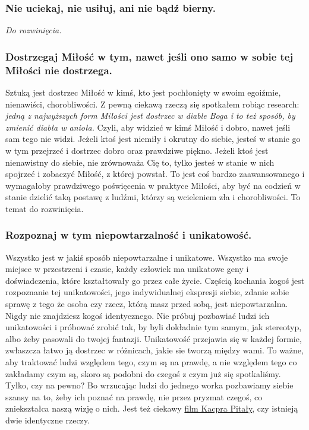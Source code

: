 \documentclass[../dotknieci-miloscia.tex]{subfiles}
\begin{document}
\subsubsection{Nie uciekaj, nie usiłuj, ani nie bądź bierny.}
\emph{Do rozwinięcia.}

\subsubsection{Dostrzegaj Miłość w tym, nawet jeśli ono samo w sobie tej Miłości nie dostrzega.}
Sztuką jest dostrzec Miłość w kimś, 
kto jest pochłonięty w swoim egoiźmie, nienawiści, chorobliwości. 
Z pewną ciekawą rzeczą się spotkałem robiąc research: 
\emph{jedną z najwyższych form Miłości jest dostrzec w diable Boga i to też sposób, by zmienić diabła w anioła.} 
Czyli, aby widzieć w kimś Miłość i dobro, nawet jeśli sam tego nie widzi. 
Jeżeli ktoś jest niemiły i okrutny do siebie, 
jesteś w stanie go w tym przejrzeć i dostrzec dobro oraz prawdziwe piękno. 
Jeżeli ktoś jest nienawistny do siebie, nie zrównoważa Cię to, 
tylko jesteś w stanie w nich spojrzeć i zobaczyć Miłość, z której powstał. 
To jest coś bardzo zaawansowanego i wymagałoby prawdziwego poświęcenia w praktyce Miłości, 
aby być na codzień w stanie dzielić taką postawę z ludźmi, 
którzy są wcieleniem zła i chorobliwości. To temat do rozwinięcia. 

\subsubsection{Rozpoznaj w tym niepowtarzalność i unikatowość.}
Wszystko jest w jakiś sposób niepowtarzalne i unikatowe. 
Wszystko ma swoje miejsce w przestrzeni i czasie, 
każdy człowiek ma unikatowe geny i doświadczenia, które kształtowały go przez całe życie. 
Częścią kochania kogoś jest rozpoznanie tej unikatowości, 
jego indywidualnej ekspresji siebie, 
zdanie sobie sprawę z tego że osoba czy rzecz, którą masz przed sobą, jest niepowtarzalna. 
Nigdy nie znajdziesz kogoś identycznego. 
Nie próbuj pozbawiać ludzi ich unikatowości i próbować zrobić tak, 
by byli dokładnie tym samym, jak stereotyp, albo żeby pasowali do twojej fantazji. 
Unikatowość przejawia się w każdej formie, 
zwłaszcza łatwo ją dostrzec w różnicach, jakie sie tworzą między wami. 
To ważne, aby traktować ludzi względem tego, czym są na prawdę, 
a nie względem tego co zakładamy czym są, 
skoro są podobni do czegoś z czym już się spotkaliśmy. 
Tylko, czy na pewno? 
Bo wrzucając ludzi do jednego worka pozbawiamy siebie szansy na to, 
żeby ich poznać na prawdę, nie przez pryzmat czegoś, co zniekształca naszą wizję o nich. 
Jest też ciekawy \href{https://youtu.be/NrNpf1ZP8i4}{film Kacpra Pitały}, czy istnieją dwie identyczne rzeczy.
\end{document}
